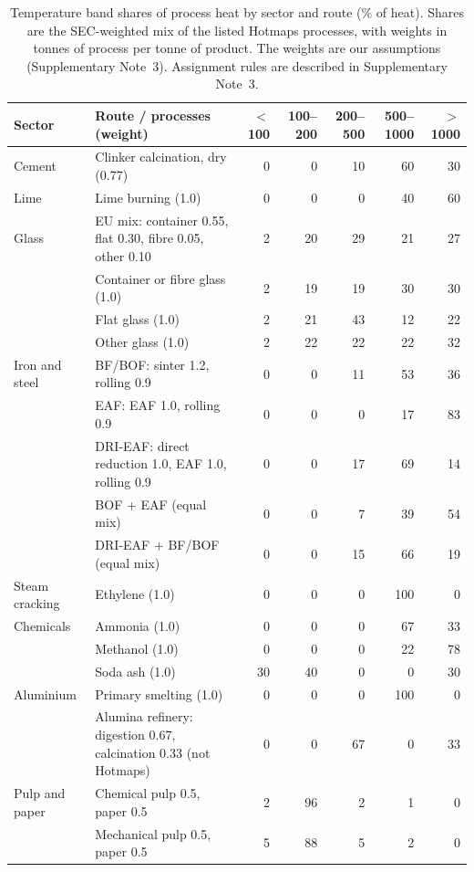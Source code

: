 \documentclass[11pt]{article}
\begin{document}
\begin{table}[h]
\centering
\small
\caption{Temperature band shares of process heat by sector and route (\% of heat). Shares are the SEC-weighted mix of the listed Hotmaps processes\cite{hotmaps2018}, with weights in tonnes of process per tonne of product. The weights are our assumptions (Supplementary Note~3). Assignment rules are described in Supplementary Note~3.}
\label{tab:bands}
\begin{tabular}{l p{} rrrrr}
\toprule
Sector & Route / processes (weight) & $<$100 & 100--200 & 200--500 & 500--1000 & $>$1000 \\
\midrule
Cement & Clinker calcination, dry (0.77) & 0 & 0 & 10 & 60 & 30 \\
Lime & Lime burning (1.0) & 0 & 0 & 0 & 40 & 60 \\
Glass & EU mix: container 0.55, flat 0.30, fibre 0.05, other 0.10 & 2 & 20 & 29 & 21 & 27 \\
 & Container or fibre glass (1.0) & 2 & 19 & 19 & 30 & 30 \\
 & Flat glass (1.0) & 2 & 21 & 43 & 12 & 22 \\
 & Other glass (1.0) & 2 & 22 & 22 & 22 & 32 \\
Iron and steel & BF/BOF: sinter 1.2, rolling 0.9 & 0 & 0 & 11 & 53 & 36 \\
 & EAF: EAF 1.0, rolling 0.9 & 0 & 0 & 0 & 17 & 83 \\
 & DRI-EAF: direct reduction 1.0, EAF 1.0, rolling 0.9 & 0 & 0 & 17 & 69 & 14 \\
 & BOF + EAF (equal mix) & 0 & 0 & 7 & 39 & 54 \\
 & DRI-EAF + BF/BOF (equal mix) & 0 & 0 & 15 & 66 & 19 \\
Steam cracking & Ethylene (1.0) & 0 & 0 & 0 & 100 & 0 \\
Chemicals & Ammonia (1.0) & 0 & 0 & 0 & 67 & 33 \\
 & Methanol (1.0) & 0 & 0 & 0 & 22 & 78 \\
 & Soda ash (1.0) & 30 & 40 & 0 & 0 & 30 \\
Aluminium & Primary smelting (1.0) & 0 & 0 & 0 & 100 & 0 \\
 & Alumina refinery: digestion 0.67, calcination 0.33\cite{aac2023alumina,deloitte2022alumina} (not Hotmaps) & 0 & 0 & 67 & 0 & 33 \\
Pulp and paper & Chemical pulp 0.5, paper 0.5 & 2 & 96 & 2 & 1 & 0 \\
 & Mechanical pulp 0.5, paper 0.5 & 5 & 88 & 5 & 2 & 0 \\

\end{tabular}
\end{table}
\end{document}
